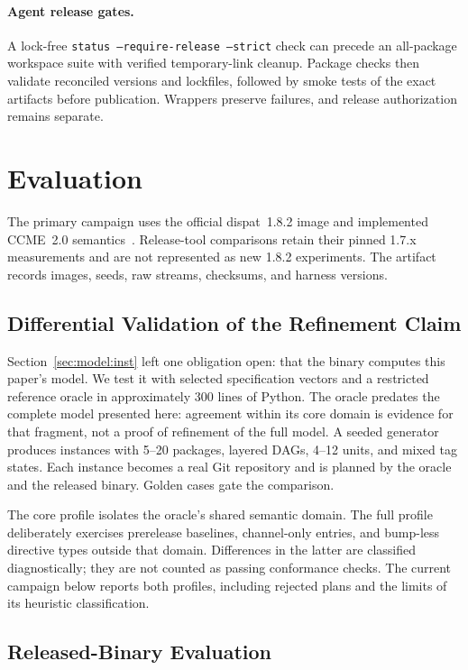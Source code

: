 \documentclass[10pt,conference]{IEEEtran}
\theoremstyle{definition}
\newcommand{\code}[1]{\texttt{#1}}
\begin{document}
\paragraph{Agent release gates.}
A lock-free \code{status --require-release --strict} check can precede
an all-package workspace suite with verified temporary-link cleanup.
Package checks then validate reconciled versions and lockfiles, followed by
smoke tests of the exact artifacts before publication. Wrappers preserve
failures, and release authorization remains separate.
\section{Evaluation}
\label{sec:eval}

The primary campaign uses the official dispat~1.8.2 image and implemented
CCME~2.0 semantics~\cite{ccme2}. Release-tool comparisons retain their pinned
1.7.x measurements and are not represented as new 1.8.2 experiments. The
artifact records images, seeds, raw streams, checksums, and harness versions.

\subsection{Differential Validation of the Refinement Claim}
\label{sec:eval:diff}

Section~\ref{sec:model:inst} left one obligation open: that the binary
computes this paper's model. We test it with selected specification vectors and a restricted reference
oracle in approximately 300 lines of Python. The oracle predates the complete
model presented here: agreement within its core domain is evidence for that
fragment, not a proof of refinement of the full model. A seeded generator
produces instances with 5--20 packages, layered DAGs, 4--12 units, and mixed
tag states. Each instance becomes a real Git repository and is planned by
the oracle and the released binary. Golden cases gate the comparison.

The core profile isolates the oracle's shared semantic domain. The full
profile deliberately exercises prerelease baselines, channel-only entries,
and bump-less directive types outside that domain. Differences in the latter
are classified diagnostically; they are not counted as passing conformance
checks. The current campaign below reports both profiles, including rejected
plans and the limits of its heuristic classification.

\subsection{Released-Binary Evaluation}
\label{sec:eval:fresh}
\end{document}
